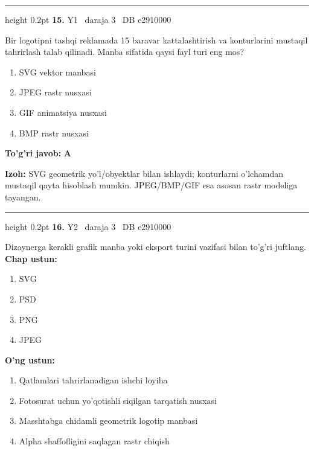 \documentclass[10pt,a4paper,oneside]{article}
\begin{document}
\vspace{2mm}\hrule height 0.2pt \vspace{4mm}
\hypertarget{q15}{\textbf{\color{ink}15.}}  {\color{muted}\scriptsize Y1 \textbullet\ daraja 3 \textbullet\ DB e2910000}
\par
Bir logotipni tashqi reklamada 15 baravar kattalashtirish va konturlarini mustaqil tahrirlash talab qilinadi. Manba sifatida qaysi fayl turi eng mos?
\begin{enumerate}[label=\Alph*),leftmargin=9mm]
\item SVG vektor manbasi
\item JPEG rastr nusxasi
\item GIF animatsiya nusxasi
\item BMP rastr nusxasi
\end{enumerate}
\begin{tcolorbox}[enhanced,breakable,colback=teal!4,colframe=teal!45!black,boxrule=0.45pt,arc=1.2mm,left=2.8mm,right=2.8mm,top=2mm,bottom=2mm,before skip=2mm,after skip=2mm]
\textbf{\color{teal}To'g'ri javob:} \textbf{A}
\par\smallskip
\textbf{Izoh:} SVG geometrik yo'l/obyektlar bilan ishlaydi; konturlarni o'lchamdan mustaqil qayta hisoblash mumkin. JPEG/BMP/GIF esa asosan rastr modeliga tayangan.
\end{tcolorbox}
\vspace{2mm}\hrule height 0.2pt \vspace{4mm}
\hypertarget{q16}{\textbf{\color{ink}16.}}  {\color{muted}\scriptsize Y2 \textbullet\ daraja 3 \textbullet\ DB e2910000}
\par
Dizaynerga kerakli grafik manba yoki eksport turini vazifasi bilan to'g'ri juftlang.
\textbf{\footnotesize Chap ustun:}
\begin{enumerate}[label=\arabic*),leftmargin=9mm]
\item SVG
\item PSD
\item PNG
\item JPEG
\end{enumerate}
\textbf{\footnotesize O'ng ustun:}
\begin{enumerate}[label=\Alph*),leftmargin=9mm]
\item Qatlamlari tahrirlanadigan ishchi loyiha
\item Fotosurat uchun yo'qotishli siqilgan tarqatish nusxasi
\item Masshtabga chidamli geometrik logotip manbasi
\item Alpha shaffofligini saqlagan rastr chiqish
\end{enumerate}
\end{document}

